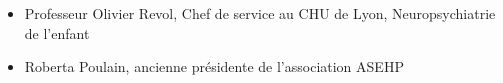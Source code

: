 \begin{itemize}
  \item Professeur Olivier Revol, Chef de service au CHU de Lyon, Neuropsychiatrie de l'enfant
  \item Roberta Poulain, ancienne présidente de l'association ASEHP
\end{itemize}